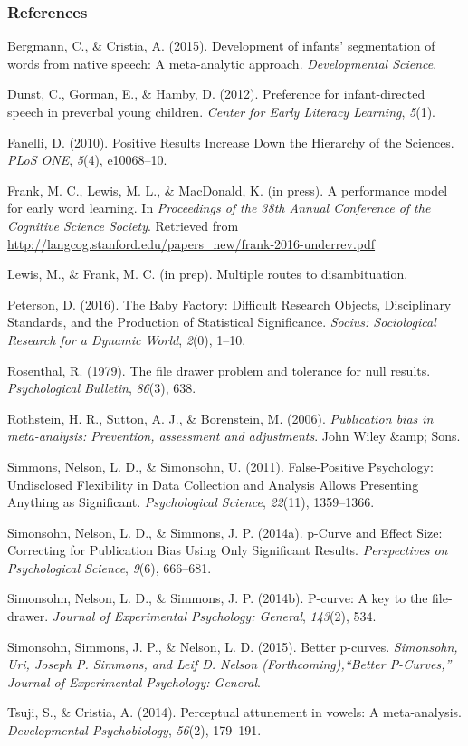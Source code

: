 \documentclass[american,floatsintext,man]{apa6}
\begin{document}
\newpage

\subsubsection{References}\label{references}

\setlength{\parindent}{-0.5in} \setlength{\leftskip}{0.5in}
\setlength{\parskip}{8pt}

Bergmann, C., \& Cristia, A. (2015). Development of infants'
segmentation of words from native speech: A meta-analytic approach.
\emph{Developmental Science}.

Dunst, C., Gorman, E., \& Hamby, D. (2012). Preference for
infant-directed speech in preverbal young children. \emph{Center for
Early Literacy Learning}, \emph{5}(1).

Fanelli, D. (2010). Positive Results Increase Down the Hierarchy of the
Sciences. \emph{PLoS ONE}, \emph{5}(4), e10068--10.

Frank, M. C., Lewis, M. L., \& MacDonald, K. (in press). A performance
model for early word learning. In \emph{Proceedings of the 38th Annual
Conference of the Cognitive Science Society}. Retrieved from
\url{http://langcog.stanford.edu/papers_new/frank-2016-underrev.pdf}

Lewis, M., \& Frank, M. C. (in prep). Multiple routes to disambituation.

Peterson, D. (2016). The Baby Factory: Difficult Research Objects,
Disciplinary Standards, and the Production of Statistical Significance.
\emph{Socius: Sociological Research for a Dynamic World}, \emph{2}(0),
1--10.

Rosenthal, R. (1979). The file drawer problem and tolerance for null
results. \emph{Psychological Bulletin}, \emph{86}(3), 638.

Rothstein, H. R., Sutton, A. J., \& Borenstein, M. (2006).
\emph{Publication bias in meta-analysis: Prevention, assessment and
adjustments}. John Wiley \&amp; Sons.

Simmons, Nelson, L. D., \& Simonsohn, U. (2011). False-Positive
Psychology: Undisclosed Flexibility in Data Collection and Analysis
Allows Presenting Anything as Significant. \emph{Psychological Science},
\emph{22}(11), 1359--1366.

Simonsohn, Nelson, L. D., \& Simmons, J. P. (2014a). p-Curve and Effect
Size: Correcting for Publication Bias Using Only Significant Results.
\emph{Perspectives on Psychological Science}, \emph{9}(6), 666--681.

Simonsohn, Nelson, L. D., \& Simmons, J. P. (2014b). P-curve: A key to
the file-drawer. \emph{Journal of Experimental Psychology: General},
\emph{143}(2), 534.

Simonsohn, Simmons, J. P., \& Nelson, L. D. (2015). Better p-curves.
\emph{Simonsohn, Uri, Joseph P. Simmons, and Leif D. Nelson
(Forthcoming),``Better P-Curves,'' Journal of Experimental Psychology:
General}.

Tsuji, S., \& Cristia, A. (2014). Perceptual attunement in vowels: A
meta-analysis. \emph{Developmental Psychobiology}, \emph{56}(2),
179--191.
\end{document}
